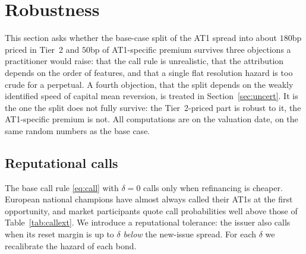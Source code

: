\section{Robustness}\label{sec:robust}

This section asks whether the base-case split of the AT1 spread into about $180$bp priced
in Tier~2 and $50$bp of AT1-specific premium survives three objections a practitioner would
raise: that the call rule is unrealistic, that the attribution depends on the order of
features, and that a single flat resolution hazard is too crude for a perpetual. A fourth
objection, that the split depends on the weakly identified speed of capital mean reversion,
is treated in Section~\ref{sec:uncert}. It is the one the split does not fully survive: the
Tier~2-priced part is robust to it, the AT1-specific premium is not. All computations are on
the valuation date, on the same random numbers as the base case.

\subsection{Reputational calls}

The base call rule \eqref{eq:call} with $\delta=0$ calls only when refinancing is cheaper.
European national champions have almost always called their AT1s at the first opportunity,
and market participants quote call probabilities well above those of
Table~\ref{tab:callext}. We introduce a reputational tolerance: the issuer also calls when its
reset margin is up to $\delta$ \emph{below} the new-issue spread. For each $\delta$ we
recalibrate the hazard of each bond.

